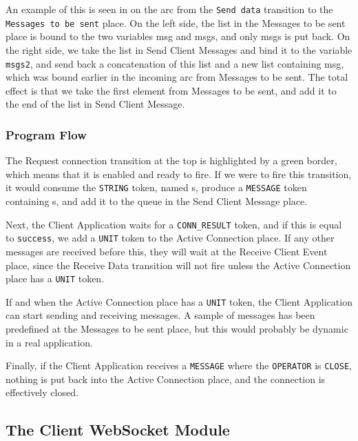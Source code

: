 		An example of this is seen in  on the arc
		from the \lstinline:Send data: transition to the 
		\lstinline:Messages to be sent: place. On the left side, the list in the
		Messages to be sent place is bound to the two variables msg and msgs, and only
		msgs is put back. On the right side, we take the list in Send Client Messages
		and bind it to the variable \lstinline:msgs2:, and send back a concatenation
		of this list and a new list containing msg, which was bound earlier in the incoming arc
		from Messages to be sent. The total effect is that we take the first element
		from Messages to be sent, and add it to the end of the list in Send Client
		Message.

	\subsubsection{Program Flow}
	
		The Request connection transition at the top is highlighted by a green border,
		which means that it is enabled and ready to fire. If we were to fire this transition,
		it would consume the \lstinline:STRING: token, named s, produce a
		\lstinline:MESSAGE: token containing s, and add it to the queue in the Send
		Client Message place.
		
		Next, the Client Application waits for a \lstinline:CONN_RESULT: token, and if
		this is equal to \lstinline:success:, we add a \lstinline:UNIT: token to the
		Active Connection place. If any other messages are received before this, they
		will wait at the Receive Client Event place, since the Receive Data transition
		will not fire unless the Active Connection place has a \lstinline:UNIT: token.
		
		If and when the Active Connection place has a \lstinline:UNIT: token, the
		Client Application can start sending and receiving messages. A sample of
		messages has been predefined at the Messages to be sent place, but this would
		probably be dynamic in a real application.
		
		Finally, if the Client Application receives a \lstinline:MESSAGE: where the
		\lstinline:OPERATOR: is \lstinline:CLOSE:, nothing is put back into the Active
		Connection place, and the connection is effectively closed. 

\subsection{The Client WebSocket Module}

